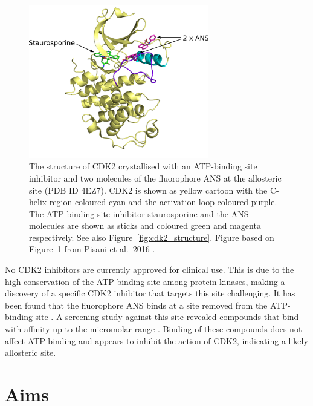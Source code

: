 \begin{figure}
\centering

\includegraphics[width=0.7\textwidth]{figures/cdk2_intro/cdk2_intro}

\caption[Structure of CDK2]
{The structure of CDK2 crystallised with an ATP-binding site inhibitor and two molecules of the fluorophore ANS at the allosteric site (PDB ID 4EZ7).
CDK2 is shown as yellow cartoon with the \textalpha C-helix region coloured cyan and the activation loop coloured purple.
The ATP-binding site inhibitor staurosporine and the ANS molecules are shown as sticks and coloured green and magenta respectively.
See also Figure~\ref{fig:cdk2_structure}.
Figure based on Figure~1 from Pisani et al.\ 2016 \cite{Pisani2016}.}

\label{fig:cdk2_intro}
\end{figure}


No CDK2 inhibitors are currently approved for clinical use.
This is due to the high conservation of the ATP-binding site among protein kinases, making a discovery of a specific CDK2 inhibitor that targets this site challenging.
It has been found that the fluorophore ANS binds at a site removed from the ATP-binding site \cite{Betzi2011}.
A screening study against this site revealed compounds that bind with affinity up to the micromolar range \cite{Rastelli2014}.
Binding of these compounds does not affect ATP binding and appears to inhibit the action of CDK2, indicating a likely allosteric site.


\section{Aims}
\label{sec:introduction_aims}

